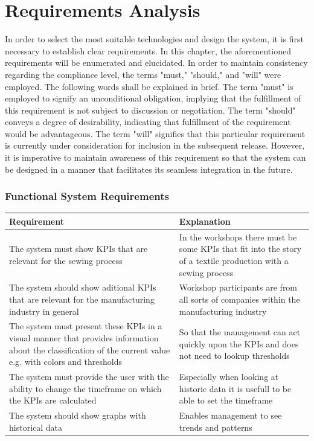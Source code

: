 \chapter{\textbf{Requirements Analysis}}\label{grundlagen}
In order to select the most suitable technologies and design the system, it is first necessary to establish clear requirements. In this chapter, the aforementioned requirements will be enumerated and elucidated.
In order to maintain consistency regarding the compliance level, the terms "must," "should," and "will" were employed.
The following words shall be explained in brief. The term "must" is employed to signify an unconditional obligation, implying that the fulfillment of this requirement is not subject to discussion or negotiation. The term "should" conveys a degree of desirability, indicating that fulfillment of the requirement would be advantageous. The term "will" signifies that this particular requirement is currently under consideration for inclusion in the subsequent release. However, it is imperative to maintain awareness of this requirement so that the system can be designed in a manner that facilitates its seamless integration in the future.
\subsection{Functional System Requirements} %
\begin{tabularx}{\textwidth}{|X|X|}
	\hline
\textbf{Requirement}	& \textbf{Explanation} \\
	\hline
The system must show KPIs that are relevant for the sewing process	&  In the workshops there must be some KPIs that fit into the story of a textile production with a sewing process\\
	\hline
The system should show aditional KPIs that are relevant for the manufacturing industry in general	&  Workshop participants are from all sorts of companies within the manufacturing industry\\
	\hline
 The system must present these KPIs in a visual manner that provides information about the classification of the current value e.g. with colors and thresholds	& So that the management can act quickly upon the KPIs and does not need to lookup thresholds \\
	\hline
The system must provide the user with the ability to change the timeframe on which the KPIs are calculated	&  Especially when looking at historic data it is usefull to be able to set the timeframe\\
	\hline
The system should show graphs with historical data & Enables management to see trends and patterns\\
	\hline
\end{tabularx}

